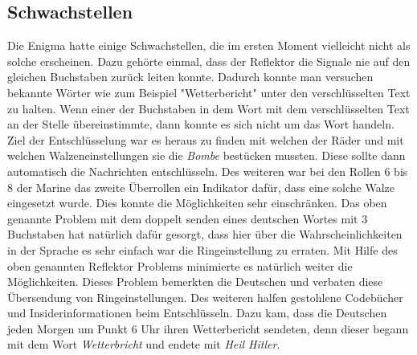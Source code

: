 \subsection{Schwachstellen}
Die Enigma hatte einige Schwachstellen, die im ersten Moment vielleicht nicht als solche erscheinen. Dazu gehörte einmal, dass der Reflektor die Signale nie auf den gleichen Buchstaben zurück leiten konnte. Dadurch konnte man versuchen bekannte Wörter wie zum Beispiel "Wetterbericht" unter den verschlüsselten Text zu halten. Wenn einer der Buchstaben in dem Wort mit dem verschlüsselten Text an der Stelle übereinstimmte, dann konnte es sich nicht um das Wort handeln. Ziel der Entschlüsselung war es heraus zu finden mit welchen der Räder und mit welchen Walzeneinstellungen sie die \emph{Bombe} bestücken mussten. Diese sollte dann automatisch die Nachrichten entschlüsseln. Des weiteren war bei den Rollen 6 bis 8 der Marine das zweite Überrollen ein Indikator dafür, dass eine solche Walze eingesetzt wurde. Dies konnte die Möglichkeiten sehr einschränken. Das oben genannte Problem mit dem doppelt senden eines deutschen Wortes mit 3 Buchstaben hat natürlich dafür gesorgt, dass hier über die Wahrscheinlichkeiten in der Sprache es sehr einfach war die Ringeinstellung zu erraten. Mit Hilfe des oben genannten Reflektor Problems minimierte es natürlich weiter die Möglichkeiten. Dieses Problem bemerkten die Deutschen und verbaten diese Übersendung von Ringeinstellungen. Des weiteren halfen gestohlene Codebücher und Insiderinformationen beim Entschlüsseln. Dazu kam, dass die Deutschen jeden Morgen  um Punkt 6 Uhr ihren Wetterbericht sendeten, denn dieser begann mit dem Wort \emph{Wetterbricht} und endete mit \emph{Heil Hitler}. \cite{enigmaflaw} \cite{enigmaproblem1}